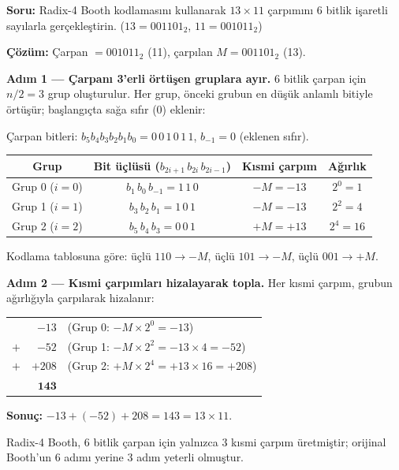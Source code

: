 \begin{ornek}[5.8]
\textbf{Soru:} Radix-4 Booth kodlamasını kullanarak $13 \times 11$ çarpımını 6 bitlik işaretli sayılarla gerçekleştirin. ($13 = 001101_2$, $11 = 001011_2$)

\textbf{Çözüm:} Çarpan $= 001011_2$ (11), çarpılan $M = 001101_2$ (13).

\textbf{Adım 1 — Çarpanı 3'erli örtüşen gruplara ayır.} 6 bitlik çarpan için $n/2 = 3$ grup oluşturulur. Her grup, önceki grubun en düşük anlamlı bitiyle örtüşür; başlangıçta sağa sıfır (0) eklenir:

Çarpan bitleri: $b_5 b_4 b_3 b_2 b_1 b_0 = 0\,0\,1\,0\,1\,1$, $b_{-1} = 0$ (eklenen sıfır).

\begin{center}
\small
\begin{tabular}{c c c c}
\toprule
\textbf{Grup} & \textbf{Bit üçlüsü} ($b_{2i+1}\,b_{2i}\,b_{2i-1}$) & \textbf{Kısmi çarpım} & \textbf{Ağırlık} \\
\midrule
Grup 0 ($i=0$) & $b_1\,b_0\,b_{-1} = 1\,1\,0$ & $-M = -13$ & $2^0 = 1$ \\
Grup 1 ($i=1$) & $b_3\,b_2\,b_1 = 1\,0\,1$ & $-M = -13$ & $2^2 = 4$ \\
Grup 2 ($i=2$) & $b_5\,b_4\,b_3 = 0\,0\,1$ & $+M = +13$ & $2^4 = 16$ \\
\bottomrule
\end{tabular}
\end{center}

Kodlama tablosuna göre: üçlü $110 \to -M$, üçlü $101 \to -M$, üçlü $001 \to +M$.

\textbf{Adım 2 — Kısmi çarpımları hizalayarak topla.} Her kısmi çarpım, grubun ağırlığıyla çarpılarak hizalanır:

\begin{center}
\small
\begin{tabular}{r r l}
& $-13$ & (Grup 0: $-M \times 2^0 = -13$) \\
$+$ & $-52$ & (Grup 1: $-M \times 2^2 = -13 \times 4 = -52$) \\
$+$ & $+208$ & (Grup 2: $+M \times 2^4 = +13 \times 16 = +208$) \\
\hline
\multicolumn{2}{r}{$\mathbf{143}$} & \\
\end{tabular}
\end{center}

\textbf{Sonuç:} $-13 + (-52) + 208 = 143 = 13 \times 11$. \checkmark

Radix-4 Booth, 6 bitlik çarpan için yalnızca 3 kısmi çarpım üretmiştir; orijinal Booth'un 6 adımı yerine 3 adım yeterli olmuştur.
\end{ornek}


